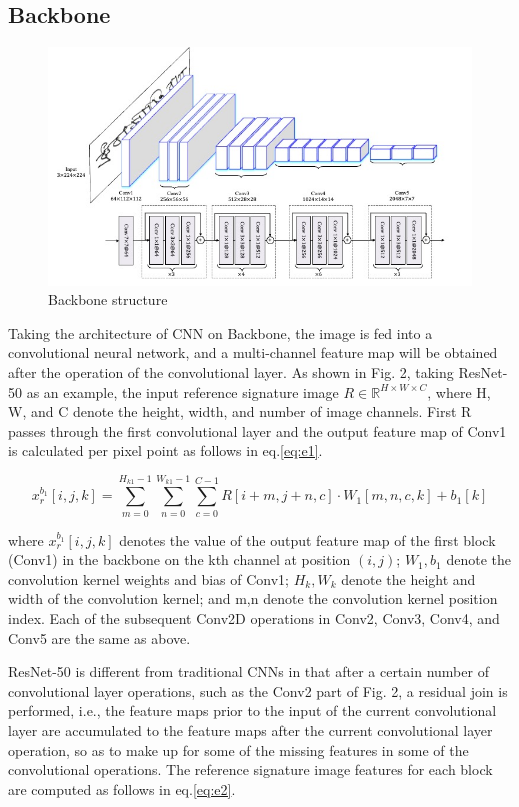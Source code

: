 \documentclass{article}
\begin{document}
\subsection{Backbone}

\begin{figure}[htbp]
	\centering
	\includegraphics[scale=0.5]{figure/p2.jpg}
	\caption{Backbone structure}\label{fig:p2}
\end{figure}

Taking the architecture of CNN on Backbone, the image is fed into a convolutional neural network, and a multi-channel feature map will be obtained after the operation of the convolutional layer. As shown in Fig. 2, taking ResNet-50 as an example, the input reference signature image $R \in \mathbb{R}^{H\times W\times C}$, where H, W, and C denote the height, width, and number of image channels. First R passes through the first convolutional layer and the output feature map of Conv1 is calculated per pixel point as follows in eq.\ref{eq:e1}.

\begin{equation}\label{eq:e1}
x_r^{b_1}[i,j,k] = \sum_{m=0}^{H_{k1}-1} \sum_{n=0}^{W_{k1}-1} \sum_{c=0}^{C-1} R[i+m,j+n,c] \cdot W_1 [m,n,c,k] + b_1[k]
\end{equation}

where $x_r^{b_1}[i,j,k]$ denotes the value of the output feature map of the first block (Conv1) in the backbone on the kth channel at position $(i, j)$; $W_1,b_1$ denote the convolution kernel weights and bias of Conv1; $H_k,W_k$ denote the height and width of the convolution kernel; and m,n denote the convolution kernel position index. Each of the subsequent Conv2D operations in Conv2, Conv3, Conv4, and Conv5 are the same as above.

ResNet-50 is different from traditional CNNs in that after a certain number of convolutional layer operations, such as the Conv2 part of Fig. 2, a residual join is performed, i.e., the feature maps prior to the input of the current convolutional layer are accumulated to the feature maps after the current convolutional layer operation, so as to make up for some of the missing features in some of the convolutional operations. The reference signature image features for each block are computed as follows in eq.\ref{eq:e2}.
\end{document}
